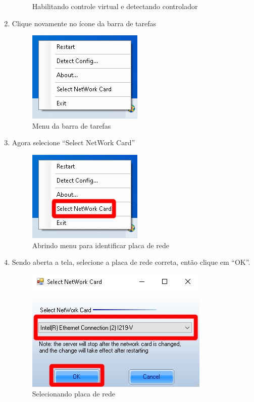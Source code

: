 \documentclass[12pt, a4paper]{article}
\begin{document}
\begin{enumerate}
\begin{figure}[!htb]
		\caption{\label{fig:detectConfig.jpeg}Habilitando controle virtual e detectando controlador}
	\end{figure}
	\item Clique novamente no ícone da barra de tarefas
	\begin{figure}[!htb]
		\centering
		\includegraphics{menuRede.jpg}
		\caption{\label{fig:menuRede.jpg}Menu da barra de tarefas}
	\end{figure}
	\item Agora selecione ``Select NetWork Card''
	\begin{figure}[!htb]
		\centering
		\includegraphics{menuRede2.jpg}
		\caption{\label{fig:menuRede2.jpg}Abrindo menu para identificar placa de rede}
	\end{figure}
	\cleardoublepage
	\item Sendo aberta a tela, selecione a placa de rede correta, então clique em ``OK''.
		\begin{figure}[!htb]
			\centering
			\includegraphics[width=.7\textwidth]{selectNetworkCard.jpeg}
			\caption{\label{fig:selectNetworkCard.jpeg}Selecionando placa de rede}
		\end{figure}
\end{enumerate}
\newpage
\end{document}
